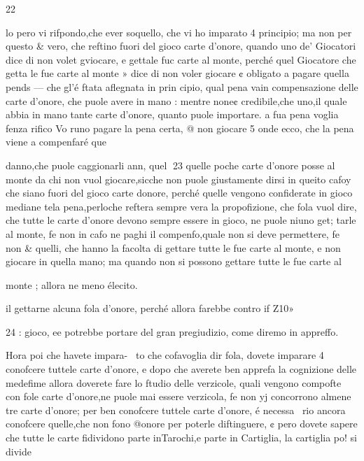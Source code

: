 \documentclass[12pt,a6paper]{article}
\begin{document}
 
 

 

 

 

 

 

 

22

lo pero vi rifpondo,che ever
soquello, che vi ho imparato 4
principio; ma non per questo &
vero, che reftino fuori del gioco carte d’onore, quando uno
de’ Giocatori dice di non volet
gviocare, e gettale fuc carte al
monte, perché quel Giocatore
che getta le fue carte al monte »
dice di non voler giocare ¢
obligato a pagare quella pends —
che gl’é ftata aflegnata in prin
cipio, qual pena vain compensazione delle carte d’onore, che
puole avere in mano : mentre
none¢ credibile,che uno,il quale
abbia in mano tante carte d’onore, quanto puole importare. a
fua pena voglia fenza rifico Vo
runo pagare la pena certa, @
non giocare 5 onde ecco, che la
pena viene a compenfaré que

danno,che puole caggionarli ann,
quel
23
quelle poche carte d’onore posse al monte da chi non vuol
giocare,sicche non puole giustamente dirsi in queito cafoy che
siano fuori del gioco carte
donore, perché quelle vengono confiderate in gioco mediane
tela pena,perloche reftera sempre vera la propofizione, che
fola vuol dire, che tutte le carte d’onore devono sempre essere in gioco, ne puole niuno get;
tarle al monte, fe non in cafo
ne paghi il compenfo,quale non
si deve permettere, fe non &
quelli, che hanno la facolta di
gettare tutte le fue carte al
monte, e non giocare in quella
mano; ma quando non si possono gettare tutte le fue carte al

monte ; allora ne meno élecito.

il gettarne alcuna fola d’onore,
perché allora farebbe contro if
Z10»

 

 
 

24 :
gioco, ee potrebbe portare del
gran pregiudizio, come diremo
in appreffo.

Hora poi che havete impara-~
to che cofavoglia dir fola, dovete imparare 4 conofcere tuttele carte d’onore, e dopo che
averete ben apprefa la cognizione delle medefime allora doverete fare lo ftudio delle verzicole, quali vengono compofte
con fole carte d’onore,ne puole
mai essere verzicola, fe non yj
concorrono almene tre carte
d’onore; per ben conofcere tuttele carte d’onore, é necessa~
rio ancora conofcere quelle,che
non fono @onore per poterle
diftinguere, ¢ pero dovete sapere che tutte le carte fidividono
parte inTarochi,e parte in Cartiglia, la cartiglia po! si divide
\end{document}

